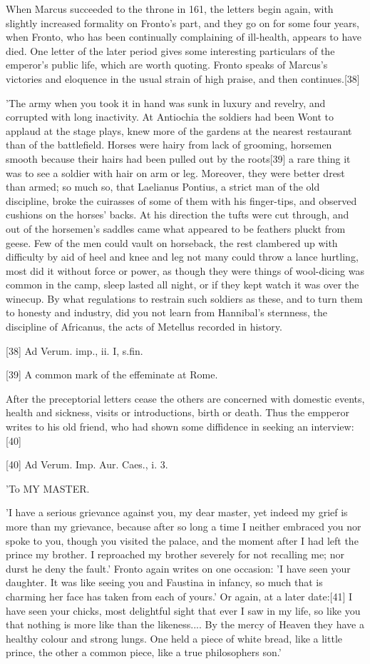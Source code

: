 When Marcus succeeded to the throne in 161, the letters begin again, with
slightly increased formality on Fronto's part, and they go on for some
four years, when Fronto, who has been continually complaining of
ill-health, appears to have died. One letter of the later period gives
some interesting particulars of the emperor's public life, which are worth
quoting. Fronto speaks of Marcus's victories and eloquence in the usual
strain of high praise, and then continues.[38]

'The army when you took it in hand was sunk in luxury and revelry, and
corrupted with long inactivity. At Antiochia the soldiers had been Wont
to applaud at the stage plays, knew more of the gardens at the nearest
restaurant than of the battlefield. Horses were hairy from lack of
grooming, horsemen smooth because their hairs had been pulled out by the
roots[39]
a rare thing it was to see a soldier with hair on arm or leg. Moreover,
they were better drest than armed; so much so, that Laelianus Pontius, a
strict man of the old discipline, broke the cuirasses of some of them
with his finger-tips, and observed cushions on the horses' backs. At his
direction the tufts were cut through, and out of the horsemen's saddles
came what appeared to be feathers pluckt from geese. Few of the men could
vault on horseback, the rest clambered up with difficulty by aid of heel
and knee and leg not many could throw a lance hurtling, most did it
without force or power, as though they were things of wool-dicing was
common in the camp, sleep lasted all night, or if they kept watch it was
over the winecup. By what regulations to restrain such soldiers as these,
and to turn them to honesty and industry, did you not learn from
Hannibal's sternness, the discipline of Africanus, the acts of Metellus
recorded in history.

[38]
Ad Verum. imp., ii. I, s.fin.

[39]
A common mark of the effeminate at Rome.

After the preceptorial letters cease the others are concerned with
domestic events, health and sickness, visits or introductions, birth or
death. Thus the empperor writes to his old friend, who had shown some
diffidence in seeking an
interview:[40]

[40]
Ad Verum. Imp. Aur. Caes., i. 3.

'To MY MASTER.

'I have a serious grievance against you, my dear master, yet indeed my
grief is more than my grievance, because after so long a time I neither
embraced you nor spoke to you, though you visited the palace, and the
moment after I had left the prince my brother. I reproached my brother
severely for not recalling me; nor durst he deny the fault.' Fronto again
writes on one occasion: 'I have seen your daughter. It was like seeing you
and Faustina in infancy, so much that is charming her face has taken from
each of yours.' Or again, at a later date:[41]
I have seen your chicks, most delightful sight that ever I saw in my
life, so like you that nothing is more like than the likeness.... By the
mercy of Heaven they have a healthy colour and strong lungs. One held a
piece of white bread, like a little prince, the other a common piece,
like a true philosophers son.'


